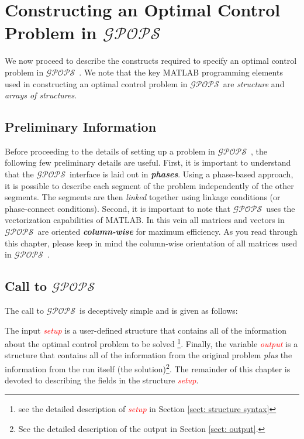 \documentclass[10pt,final]{report}
\newcommand{\gpops}{$\mathcal{GPOPS}$~}
\newcommand{\slred}[1]{\textcolor{red}{\sl #1}}
\begin{document}
\chapter{Constructing an Optimal Control Problem in \gpops}

We now proceed to describe the constructs required to specify an
optimal control problem in \gpops.  We note that the key
MATLAB programming elements used in constructing an optimal control
problem in \gpops are {\em structure} and {\em arrays of structures}.

\section{Preliminary Information}

Before proceeding to the details of setting up a problem in
\gpops, the following few preliminary details are useful.  First,
it is important to understand that the \gpops interface is laid
out in {\bf\em phases}.  Using a phase-based approach, it is possible
to describe each segment of the problem independently of the other
segments.  The segments are then {\em linked} together using linkage
conditions (or phase-connect conditions).  Second, it is important to
note that \gpops uses the vectorization capabilities of MATLAB.
In this vein all matrices and vectors in \gpops are oriented
{\bf\em column-wise} for maximum efficiency.  As you read through this
chapter, please keep in mind the column-wise orientation of all
matrices used in \gpops.

\section{Call to \gpops}

The call to \gpops is deceptively simple and is given as follows:
\begin{center}
\end{center}
The input \slred{setup} is a user-defined structure that contains all
of the information about the optimal control problem to be solved
\footnote{see the detailed description of \slred{setup} in Section
\ref{sect: structure syntax}}.  Finally, the variable
\slred{output} is a structure that contains all of the information
from the original problem {\em plus} the information from the run
itself (\ie the solution)\footnote{See the detailed description of the
  output in Section \ref{sect: output}.}.  The remainder of this
chapter is devoted to describing the fields in the structure \slred{setup}.
\end{document}
